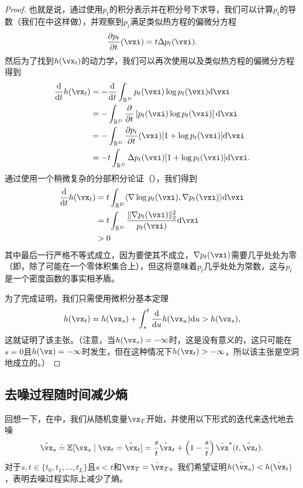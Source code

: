 \documentclass[../../book-main_zh.tex]{subfiles}
\begin{document}
\begin{proof}
    也就是说，通过使用\(p_{t}\)的积分表示并在积分号下求导，我们可以计算\(p_{t}\)的导数（我们在中这样做），并观察到\(p_{t}\)满足类似热方程的偏微分方程
    \begin{equation}
        \pdv{p_{t}}{t}(\vxi) = t\Delta p_{t}(\vxi).
    \end{equation}
    然后为了找到\(h(\vx_{t})\)的动力学，我们可以再次使用以及类似热方程的偏微分方程得到
    \begin{align}
        \odv*{h(\vx_{t})}{t}
        &= -\odv*{\int_{\R^{D}}p_{t}(\vxi)\log p_{t}(\vxi)\odif{\vxi}}{t} \\
        &= -\int_{\R^{D}}\pdv*{\bs{p_{t}(\vxi)\log p_{t}(\vxi)}}{t}\odif{\vxi} \\
        &= -\int_{\R^{D}}\pdv{p_{t}}{t}(\vxi)[1 + \log p_{t}(\vxi)]\odif{\vxi} \\
        &= -t\int_{\R^{D}}\Delta p_{t}(\vxi)[1 + \log p_{t}(\vxi)]\odif{\vxi}.
    \end{align}
    通过使用一个稍微复杂的分部积分论证（），我们得到
    \begin{align}
        \odv*{h(\vx_{t})}{t}
        &= t\int_{\R^{D}}\ip{\nabla \log p_{t}(\vxi)}{\nabla p_{t}(\vxi)}\odif{\vxi} \\
        &= t\int_{\R^{D}}\frac{\norm{\nabla p_{t}(\vxi)}_{2}^{2}}{p_{t}(\vxi)}\odif{\vxi} \\
        &> 0
    \end{align}
    其中最后一行严格不等式成立，因为要使其不成立，\(\nabla p_{t}(\vxi)\)需要几乎处处为零（即，除了可能在一个零体积集合上），但这将意味着\(p_{t}\)几乎处处为常数，这与\(p_{t}\)是一个密度函数的事实相矛盾。

    为了完成证明，我们只需使用微积分基本定理
    \begin{equation}
        h(\vx_{t}) = h(\vx_{s}) + \int_{s}^{t}\odv*{h(\vx_{u})}{u}\odif{u} > h(\vx_{s}),
    \end{equation}
    这就证明了该主张。（注意，当\(h(\vx_{s}) = -\infty\)时，这是没有意义的，这只可能在\(s = 0\)且\(h(\vx) = -\infty\)时发生，但在这种情况下\(h(\vx_{t}) > -\infty\)，所以该主张是空洞地成立的。）
\end{proof}

\subsection{去噪过程随时间减少熵}\label{sub:denoising_entropy_decreases}

回想一下，在中，我们从随机变量\(\vx_{T}\)开始，并使用以下形式的迭代来迭代地去噪
\begin{equation}\label{eq:app_denoising_iteration}
    \hat{\vx}_{s} \doteq \Ex[\vx_{s} \mid \vx_{t} = \hat{\vx}_{t}] = \frac{s}{t}\hat{\vx}_{t} + \bp{1 - \frac{s}{t}}\bar{\vx}^{\ast}(t, \hat{\vx}_{t}).
\end{equation}
对于\(s, t \in \{t_{0}, t_{1}, \dots, t_{L}\}\)且\(s < t\)和\(\vx_{T} = \hat{\vx}_{T}\)。我们希望证明\(h(\hat{\vx}_{s}) < h(\hat{\vx}_{t})\)，表明去噪过程实际上减少了熵。
\end{document}
